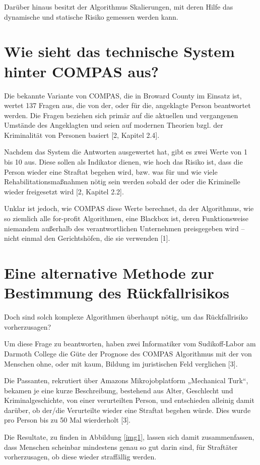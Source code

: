 \documentclass[10pt, a4paper, twocolumn]{article} %
\begin{document}
Darüber hinaus besitzt der Algorithmus Skalierungen, mit deren Hilfe das dynamische und statische Risiko gemessen werden kann. 


\section{Wie sieht das technische System hinter COMPAS aus?}

Die bekannte Variante von COMPAS, die in Broward County im Einsatz ist, wertet 137 Fragen aus, die von der, oder für die, angeklagte Person beantwortet werden. Die Fragen beziehen sich primär auf die aktuellen und vergangenen Umstände des Angeklagten und seien auf modernen Theorien bzgl. der Kriminalität von Personen basiert [2, Kapitel 2.4]. 

Nachdem das System die Antworten ausgewertet hat, gibt es zwei Werte von 1 bis 10 aus. Diese sollen als Indikator dienen, wie hoch das Risiko ist, dass die Person wieder eine Straftat begehen wird, bzw. was für und wie viele Rehabilitationsmaßnahmen nötig sein werden sobald der oder die Kriminelle wieder freigesetzt wird [2, Kapitel 2.2].

Unklar ist jedoch, wie COMPAS diese Werte berechnet, da der Algorithmus, wie so ziemlich alle for-profit Algorithmen, eine Blackbox ist, deren Funktionsweise niemandem außerhalb des verantwortlichen Unternehmen preisgegeben wird – nicht einmal den Gerichtshöfen, die sie verwenden [1].

\section{Eine alternative Methode zur Bestimmung des Rückfallrisikos}
Doch sind solch komplexe Algorithmen überhaupt nötig, um das Rückfallrisiko vorherzusagen?

Um diese Frage zu beantworten, haben zwei Informatiker vom Sudikoff-Labor am Darmoth College die Güte der Prognose des COMPAS Algorithmus mit der von Menschen ohne, oder mit kaum, Bildung im juristischen Feld verglichen [3]. 

Die Passanten, rekrutiert über Amazons Mikrojobplatform „Mechanical Turk“, bekamen je eine kurze Beschreibung, bestehend aus Alter, Geschlecht und Kriminalgeschichte, von einer verurteilten Person, und entschieden alleinig damit darüber, ob der/die Verurteilte wieder eine Straftat begehen würde. Dies wurde pro Person bis zu 50 Mal wierderholt [3].

Die Resultate, zu finden in Abbildung \ref{img1}, lassen sich damit zusammenfassen, dass Menschen scheinbar mindestens genau so gut darin sind, für Straftäter vorherzusagen, ob diese wieder straffällig werden. 
\end{document}

